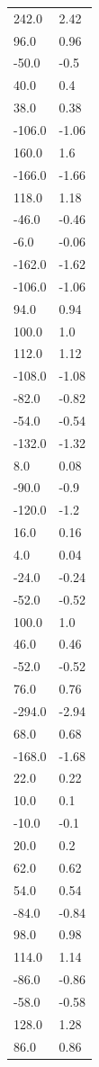 \begin{longtable}{ll}
242.0 & 2.42 \\
96.0 & 0.96 \\
-50.0 & -0.5 \\
40.0 & 0.4 \\
38.0 & 0.38 \\
-106.0 & -1.06 \\
160.0 & 1.6 \\
-166.0 & -1.66 \\
118.0 & 1.18 \\
-46.0 & -0.46 \\
-6.0 & -0.06 \\
-162.0 & -1.62 \\
-106.0 & -1.06 \\
94.0 & 0.94 \\
100.0 & 1.0 \\
112.0 & 1.12 \\
-108.0 & -1.08 \\
-82.0 & -0.82 \\
-54.0 & -0.54 \\
-132.0 & -1.32 \\
8.0 & 0.08 \\
-90.0 & -0.9 \\
-120.0 & -1.2 \\
16.0 & 0.16 \\
4.0 & 0.04 \\
-24.0 & -0.24 \\
-52.0 & -0.52 \\
100.0 & 1.0 \\
46.0 & 0.46 \\
-52.0 & -0.52 \\
76.0 & 0.76 \\
-294.0 & -2.94 \\
68.0 & 0.68 \\
-168.0 & -1.68 \\
22.0 & 0.22 \\
10.0 & 0.1 \\
-10.0 & -0.1 \\
20.0 & 0.2 \\
62.0 & 0.62 \\
54.0 & 0.54 \\
-84.0 & -0.84 \\
98.0 & 0.98 \\
114.0 & 1.14 \\
-86.0 & -0.86 \\
-58.0 & -0.58 \\
128.0 & 1.28 \\
86.0 & 0.86 \\

\end{longtable}
